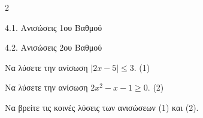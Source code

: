 \begin{ylh}{2}
    \item 4.1. Ανισώσεις 1ου Βαθμού
    \item 4.2. Ανισώσεις 2ου Βαθμού
\end{ylh}

\begin{alist}
\item Να λύσετε την ανίσωση $|2x - 5| \leq 3$. (1)
\item Να λύσετε την ανίσωση $2x^{2} - x - 1 \geq 0.$ (2)
\item Να βρείτε τις κοινές λύσεις των ανισώσεων (1) και (2).
\end{alist}

